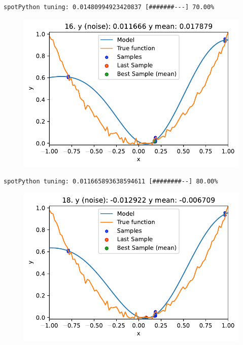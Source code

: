 \documentclass[
  letterpaper,
  DIV=11,
  numbers=noendperiod]{scrreprt}
\begin{document}
\begin{verbatim}
spotPython tuning: 0.01480994923420837 [#######---] 70.00% 
\end{verbatim}

\begin{figure}[H]

{\centering \includegraphics{013_num_spot_noisy_files/figure-pdf/cell-6-output-10.pdf}

}

\end{figure}

\begin{verbatim}
spotPython tuning: 0.011665893638594611 [########--] 80.00% 
\end{verbatim}

\begin{figure}[H]

{\centering \includegraphics{013_num_spot_noisy_files/figure-pdf/cell-6-output-12.pdf}

}

\end{figure}
\end{document}
